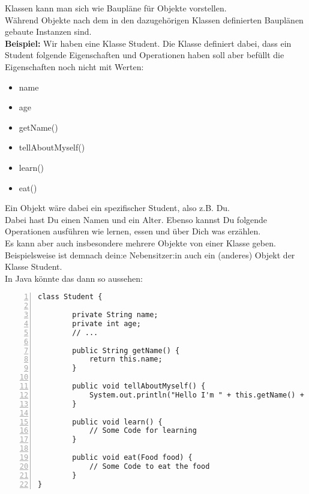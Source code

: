 


\begin{Infobox}
    Klassen kann man sich wie Baupläne für Objekte vorstellen.\\
    Während Objekte nach dem in den dazugehörigen Klassen definierten Bauplänen gebaute Instanzen sind.\\

    \textbf{Beispiel:} Wir haben eine Klasse Student.
    Die Klasse definiert dabei, dass ein Student folgende Eigenschaften und Operationen haben soll aber befüllt die Eigenschaften noch nicht mit Werten:

    \begin{itemize}
        \item name
        \item age
        \item getName()
        \item tellAboutMyself()
        \item learn()
        \item eat()
    \end{itemize}

    Ein Objekt wäre dabei ein spezifischer Student, also z.B. Du.\\
Dabei hast Du einen Namen und ein Alter.
Ebenso kannst Du folgende Operationen ausführen wie lernen, essen und über Dich was erzählen.\\
Es kann aber auch insbesondere mehrere Objekte von einer Klasse geben. Beispielsweise ist demnach  dein:e Nebensitzer:in auch ein (anderes) Objekt der Klasse Student.\\
In Java könnte das dann so aussehen:
    \begin{lstlisting}[numbers=left,xleftmargin=2em,frame=single,framexleftmargin=1.5em]
class Student {

        private String name;
        private int age;
        // ...

        public String getName() {
            return this.name;
        }

        public void tellAboutMyself() {
            System.out.println("Hello I'm " + this.getName() + ". I'm " + age + " old!";
        }

        public void learn() {
            // Some Code for learning
        }

        public void eat(Food food) {
            // Some Code to eat the food
        }
}

    \end{lstlisting}
\end{Infobox}

